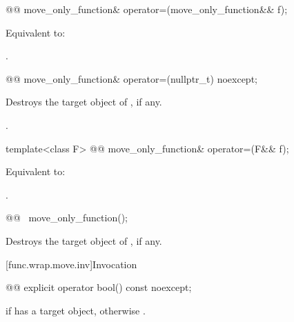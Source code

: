 %
\begin{itemdecl}
@@ move_only_function& operator=(move_only_function&& f);
\end{itemdecl}

\begin{itemdescr}
\pnum
\effects
Equivalent to: 

\pnum
\returns
{}.
\end{itemdescr}

%
\begin{itemdecl}
@@ move_only_function& operator=(nullptr_t) noexcept;
\end{itemdecl}

\begin{itemdescr}
\pnum
\effects
Destroys the target object of , if any.

\pnum
\returns
{}.
\end{itemdescr}

%
\begin{itemdecl}
template<class F>
  @@ move_only_function& operator=(F&& f);
\end{itemdecl}

\begin{itemdescr}
\pnum
\effects
Equivalent to: 

\pnum
\returns
{}.
\end{itemdescr}

%
\begin{itemdecl}
@@ ~move_only_function();
\end{itemdecl}

\begin{itemdescr}
\pnum
\effects
Destroys the target object of , if any.
\end{itemdescr}

[func.wrap.move.inv]{Invocation}

%
\begin{itemdecl}
@@ explicit operator bool() const noexcept;
\end{itemdecl}

\begin{itemdescr}
\pnum
\returns
{} if  has a target object, otherwise .
\end{itemdescr}

